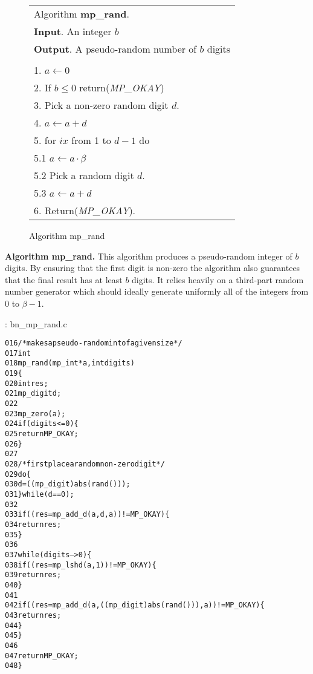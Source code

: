 \documentclass[b5paper]{book}
\begin{document}
\newpage\begin{figure}[!here]
\begin{small}
\begin{center}
\begin{tabular}{l}
\hline Algorithm \textbf{mp\_rand}. \\
\textbf{Input}.   An integer $b$ \\
\textbf{Output}.  A pseudo-random number of $b$ digits \\
\hline \\
1.  $a \leftarrow 0$ \\
2.  If $b \le 0$ return(\textit{MP\_OKAY}) \\
3.  Pick a non-zero random digit $d$. \\
4.  $a \leftarrow a + d$ \\
5.  for $ix$ from 1 to $d - 1$ do \\
\hspace{3mm}5.1  $a \leftarrow a \cdot \beta$ \\
\hspace{3mm}5.2  Pick a random digit $d$. \\
\hspace{3mm}5.3  $a \leftarrow a + d$ \\
6.  Return(\textit{MP\_OKAY}). \\
\hline
\end{tabular}
\end{center}
\end{small}
\caption{Algorithm mp\_rand}
\end{figure}
\textbf{Algorithm mp\_rand.}
This algorithm produces a pseudo-random integer of $b$ digits.  By ensuring that the first digit is non-zero the algorithm also guarantees that the
final result has at least $b$ digits.  It relies heavily on a third-part random number generator which should ideally generate uniformly all of
the integers from $0$ to $\beta - 1$.  

\vspace{+3mm}\begin{small}
\hspace{-5.1mm}{\bf File}: bn\_mp\_rand.c
\vspace{-3mm}
\begin{alltt}
016   /* makes a pseudo-random int of a given size */
017   int
018   mp_rand (mp_int * a, int digits)
019   \{
020     int     res;
021     mp_digit d;
022   
023     mp_zero (a);
024     if (digits <= 0) \{
025       return MP_OKAY;
026     \}
027   
028     /* first place a random non-zero digit */
029     do \{
030       d = ((mp_digit) abs (rand ()));
031     \} while (d == 0);
032   
033     if ((res = mp_add_d (a, d, a)) != MP_OKAY) \{
034       return res;
035     \}
036   
037     while (digits-- > 0) \{
038       if ((res = mp_lshd (a, 1)) != MP_OKAY) \{
039         return res;
040       \}
041   
042       if ((res = mp_add_d (a, ((mp_digit) abs (rand ())), a)) != MP_OKAY) \{
043         return res;
044       \}
045     \}
046   
047     return MP_OKAY;
048   \}
\end{alltt}
\end{small}
\end{document}

